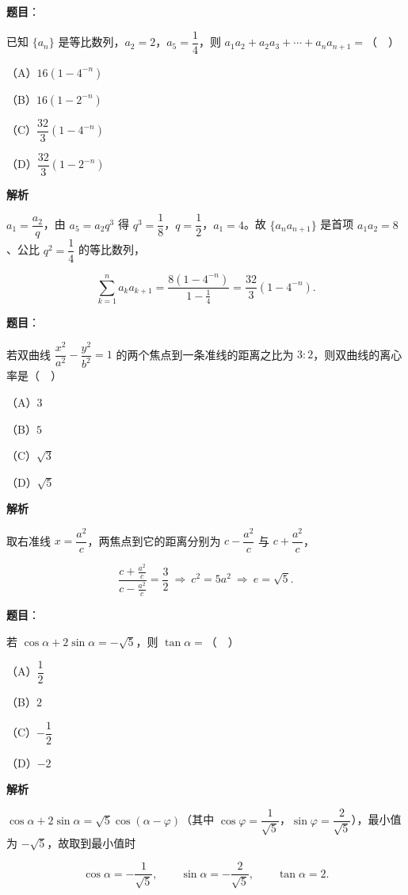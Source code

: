 \begin{answer}

\textbf{题目}：

已知 $\{a_n\}$ 是等比数列，$a_2=2$，$a_5=\dfrac14$，则 $a_1a_2+a_2a_3+\cdots+a_na_{n+1}=$（　）

（A）$16\left(1-4^{-n}\right)$

（B）$16\left(1-2^{-n}\right)$

（C）$\dfrac{32}3\left(1-4^{-n}\right)$

（D）$\dfrac{32}3\left(1-2^{-n}\right)$

\textbf{解析}

$a_1=\dfrac{a_2}{q}$，由 $a_5=a_2q^3$ 得 $q^3=\dfrac18$，$q=\dfrac12$，$a_1=4$。故 $\{a_na_{n+1}\}$ 是首项 $a_1a_2=8$、公比 $q^2=\dfrac14$ 的等比数列，

\nopagebreak[4]
\[\sum_{k=1}^na_ka_{k+1}=\frac{8\left(1-4^{-n}\right)}{1-\frac14}=\frac{32}3\left(1-4^{-n}\right).\]


\end{answer}
\begin{answer}

\textbf{题目}：

若双曲线 $\dfrac{x^2}{a^2}-\dfrac{y^2}{b^2}=1$ 的两个焦点到一条准线的距离之比为 $3:2$，则双曲线的离心率是（　）

（A）$3$

（B）$5$

（C）$\sqrt3$

（D）$\sqrt5$

\textbf{解析}

取右准线 $x=\dfrac{a^2}c$，两焦点到它的距离分别为 $c-\dfrac{a^2}c$ 与 $c+\dfrac{a^2}c$，

\nopagebreak[4]
\[\frac{c+\frac{a^2}c}{c-\frac{a^2}c}=\frac32\ \Longrightarrow\ c^2=5a^2\ \Longrightarrow\ e=\sqrt5.\]


\end{answer}
\begin{answer}

\textbf{题目}：

若 $\cos\alpha+2\sin\alpha=-\sqrt5$，则 $\tan\alpha=$（　）

（A）$\dfrac12$

（B）$2$

（C）$-\dfrac12$

（D）$-2$

\textbf{解析}

$\cos\alpha+2\sin\alpha=\sqrt5\cos(\alpha-\varphi)$（其中 $\cos\varphi=\dfrac1{\sqrt5}$，$\sin\varphi=\dfrac2{\sqrt5}$），最小值为 $-\sqrt5$，故取到最小值时

\nopagebreak[4]
\[\cos\alpha=-\frac1{\sqrt5},\qquad \sin\alpha=-\frac2{\sqrt5},\qquad \tan\alpha=2.\]


\end{answer}
